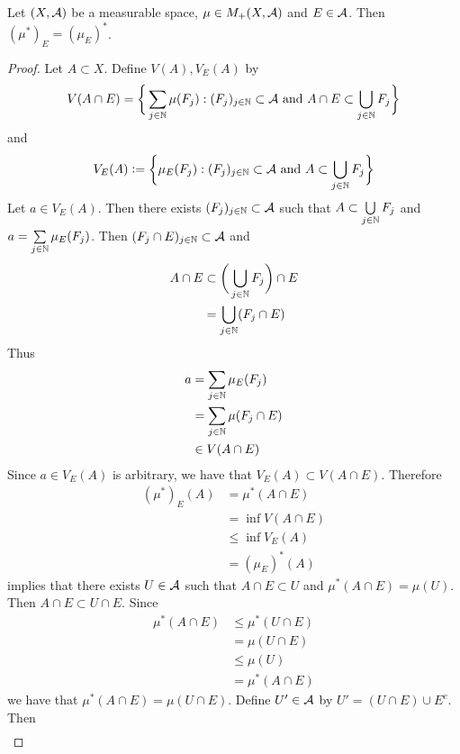 \documentclass{book}
\begin{document}
	\begin{ex}  
		Let $(X, \mathcal{A})$ be a measurable space, $\mu \in M_+(X, \mathcal{A})$ and $E\in \mathcal{A}$. Then $(\mu^*)_E = (\mu_E)^*$. 
	\end{ex}
	
	\begin{proof}
		Let $A \subset X$. Define $V(A), V_E(A)$ by 
		$$V(A \cap E) = \bigg \{\sum\limits_{j \in \mathbb{N}} \mu(F_j): (F_j)_{j \in \mathbb{N}} \subset \mathcal{A} \text{ and } A \cap E \subset \bigcup\limits_{j \in \mathbb{N}} F_j \bigg \}$$ 
		and 
		$$V_E(A) \vcentcolon=  \bigg \{\mu_E(F_j): (F_j)_{j \in \mathbb{N}} \subset \mathcal{A} \text{ and } A \subset \bigcup\limits_{j \in \mathbb{N}} F_j  \bigg\}$$
		Let $a \in V_E(A)$. Then there exists $(F_j)_{j \in \mathbb{N}} \subset \mathcal{A}$ such that $A \subset \bigcup\limits_{j \in \mathbb{N}} F_j$ and $a = \sum\limits_{j \in \mathbb{N}} \mu_E(F_j)$. Then $(F_j \cap E)_{j \in \mathbb{N}} \subset \mathcal{A}$ and 
		\begin{align*}
			A \cap E
			& \subset \bigg( \bigcup\limits_{j \in \mathbb{N}} F_j \bigg) \cap E \\
			& = \bigcup\limits_{j \in \mathbb{N}} (F_j  \cap E)
		\end{align*}
		Thus 
		\begin{align*}
			a
			& = \sum\limits_{j \in \mathbb{N}} \mu_E(F_j) \\
			& = \sum\limits_{j \in \mathbb{N}} \mu(F_j \cap E) \\
			& \in V(A \cap E) 
		\end{align*}
		Since $a \in V_E(A)$ is arbitrary, we have that $V_E(A) \subset V(A \cap E)$. Therefore
		\begin{align*}
			(\mu^*)_E(A)
			& = \mu^*(A \cap E) \\
			& = \inf V(A \cap E) \\
			& \leq \inf V_E(A) \\
			& = (\mu_E)^*(A)
		\end{align*}
		 implies that there exists $U \in \mathcal{A}$ such that $A \cap E \subset U$ and $\mu^*(A \cap E) = \mu(U)$. Then $A \cap E \subset U \cap E$. Since 
		\begin{align*}
			\mu^*(A \cap E)
			& \leq \mu^*(U \cap E) \\
			& = \mu(U \cap E) \\
			& \leq \mu(U) \\
			& = \mu^*(A \cap E)
		\end{align*} 
		we have that $\mu^*(A \cap E) = \mu(U \cap E)$. Define $U' \in \mathcal{A}$ by $U' = (U \cap E) \cup E^c$. Then 
		\begin{align*}

\end{align*}
\end{proof}
\end{document}
